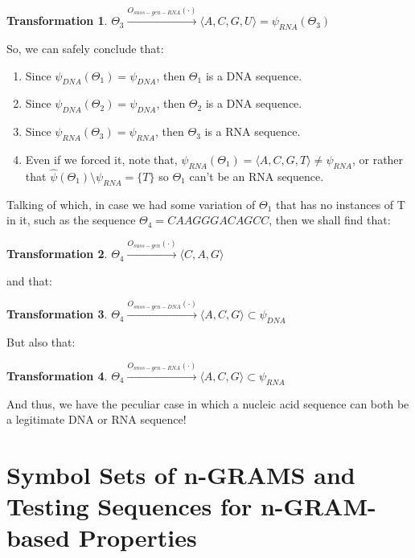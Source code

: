 \documentclass[a4paper, 18pt]{book} %
\newtheorem{trans}{Transformation}
\begin{document}
\begin{trans}
$\Theta_3 \xrightarrow{O_{snss-gen-RNA}(\cdot)} \langle A, C, G, U \rangle = \psi_{RNA}(\Theta_3)$\\
\end{trans}

So, we can safely conclude that:

\begin{enumerate}
\item Since $\psi_{DNA}(\Theta_1) = \psi_{DNA}$, then $\Theta_1$ is a DNA sequence.
\item Since $\psi_{DNA}(\Theta_2) = \psi_{DNA}$, then $\Theta_2$ is a DNA sequence.
\item Since $\psi_{RNA}(\Theta_3) = \psi_{RNA}$, then $\Theta_3$ is a RNA sequence.
\item Even if we forced it, note that, $\psi_{RNA}(\Theta_1) = \langle A, C, G, T \rangle \neq \psi_{RNA}$, or rather that $\hat{\psi}(\Theta_1) \setminus \psi_{RNA} = \{T\}$ so $\Theta_1$ can't be an RNA sequence.
\end{enumerate} 

Talking of which, in case we had some variation of $\Theta_1$ that has no instances of T in it, such as the sequence $\Theta_4 = CAAGGGACAGCC$, then we shall find that:

\begin{trans}
$\Theta_4 \xrightarrow{O_{suss-gen}(\cdot)} \langle C, A, G \rangle$
\end{trans}

and that:

\begin{trans}
$\Theta_4 \xrightarrow{O_{snss-gen-DNA}(\cdot)} \langle A, C, G \rangle \subset \psi_{DNA}$
\end{trans}

But also that:

\begin{trans}
$\Theta_4 \xrightarrow{O_{snss-gen-RNA}(\cdot)} \langle A, C, G \rangle \subset \psi_{RNA}$
\end{trans}

And thus, we have the peculiar case in which a nucleic acid sequence can both be a legitimate DNA or RNA sequence! 


\section{Symbol Sets of n-GRAMS and Testing Sequences for n-GRAM-based Properties}
\label{SECSYMBOLSETSNGRAMS}
\end{document}
